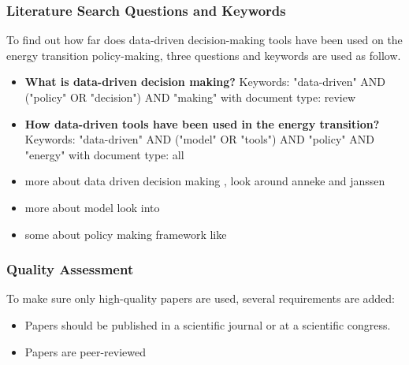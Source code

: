 \subsubsection{Literature Search Questions and Keywords}
To find out how far does data-driven decision-making tools have been used on the energy transition policy-making, three questions and keywords are used as follow. 
\begin{itemize}
  \item \textbf{What is data-driven decision making?} Keywords: "data-driven" AND ("policy" OR "decision") AND "making" with document type: review
  \item \textbf{How data-driven tools have been used in the energy transition?} Keywords: "data-driven" AND ("model" OR  "tools") AND  "policy" AND "energy" with document type: all
    \item more about data driven decision making \citep{Diran2019Data-drivenApproach}, look around anneke and janssen
      \item more about model look into  \citep{Hesselink2019AdoptionStudies, Friege2014ModellingReview}
          \item some about policy making framework like    \citep{Farshidi2018ASelection, Sage1991DecisionEngineering, Sprague1980ASystems, Sprague1979BitSystems}
  
\end{itemize}

\subsubsection{Quality Assessment}
To make sure only high-quality papers are used, several requirements are added:
\begin{itemize}
     \item Papers should be published in a scientific journal or at a scientific congress.
    \item Papers are peer-reviewed
\end{itemize}

